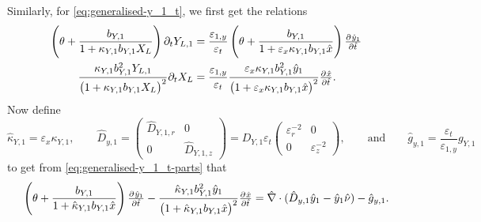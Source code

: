 \documentclass[11pt]{article}
\numberwithin{equation}{section}
\begin{document}
Similarly, for \eqref{eq:generalised-y_1_t}, we first get the relations
\begin{subequations}
\label{eq:generalised-y_1_t-parts}
\begin{align}
    \left(\theta + \frac{b_{Y,1}}{1 + \kappa_{Y,1} b_{Y,1} X_L}\right) \partial_t Y_{L,1} 
    &= 
    \frac{\varepsilon_{1,y}}{\varepsilon_t} \left( \theta + \frac{b_{Y,1}}{1 + \varepsilon_{x} \kappa_{Y,1} b_{Y,1} \hat{x} } \right)  \pd{\hat{y}_1}{\hat{t}}
    \\
    \frac{ \kappa_{Y,1} b_{Y,1}^2 Y_{L,1}}{\big(1 + \kappa_{Y,1} b_{Y,1} X_L\big)^2} \partial_t X_L
    &=
    \frac{\varepsilon_{1,y}}{\varepsilon_t}
    \frac{ \varepsilon_x  \kappa_{Y,1} b_{Y,1}^2 \hat{y}_{1}}{\big(1 + \varepsilon_x \kappa_{Y,1} b_{Y,1} \hat{x} \big)^2}
    \pd{\hat{x}}{\hat{t}}.
\end{align}
\end{subequations}
Now define
\[
    \hat{\kappa}_{Y,1} = \varepsilon_{x} \kappa_{Y,1},
    \qquad
    \hat{D}_{y,1} = 
    \begin{pmatrix}
         \hat{D}_{Y,1,r} & 0 
         \\
        0 &  \hat{D}_{Y,1,z}
    \end{pmatrix}
    =
    D_{Y,1} \varepsilon_t
    \begin{pmatrix}
         \varepsilon_r^{-2} & 0 
         \\
        0 &  \varepsilon_z^{-2}
    \end{pmatrix},
    \qquad\text{and}\qquad
    \hat{g}_{y,1} = \frac{\varepsilon_t}{\varepsilon_{1,y}} g_{Y,1}
\]
to get from \eqref{eq:generalised-y_1_t-parts} that
\begin{equation}
    \left( \theta + \frac{b_{Y,1}}{1 + \hat{\kappa}_{Y,1} b_{Y,1} \hat{x} } \right)  \pd{\hat{y}_1}{\hat{t}}
    -
    \frac{ \hat{\kappa}_{Y,1} b_{Y,1}^2 \hat{y}_{1}}{\big(1 + \hat{\kappa}_{Y,1} b_{Y,1} \hat{x} \big)^2}
    \pd{\hat{x}}{\hat{t}}
    = \hat{\nabla} \cdot (\hat{D}_{y,1} \hat{y}_1 - \hat{y}_1 \hat{\nu}) - \hat{g}_{y,1}.
\end{equation}
\end{document}
